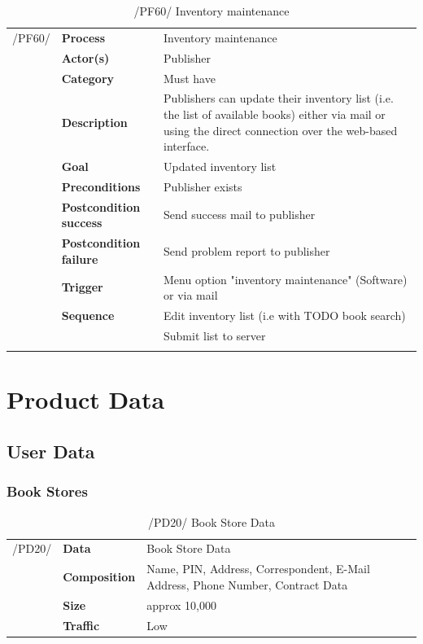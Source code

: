 \documentclass[11pt,a4paper,oneside,svgnames]{report}
\begin{document}
\begin{table}[H]
\centering
\begin{tabular}{p{1.5cm}p{3cm}p{8cm}}
\cellcolor{white}/PF60/	& \textbf{Process} & Inventory maintenance\\
\cellcolor{white}		& \textbf{Actor(s)} & Publisher\\
\cellcolor{white}		& \textbf{Category} & Must have\\
\cellcolor{white}		& \textbf{Description}	 & Publishers can update their inventory list
(i.e. the list of available books) either via mail or using the direct connection over the web-based interface.\\
\cellcolor{white}		& \textbf{Goal} & Updated inventory list\\
\cellcolor{white}		& \textbf{Preconditions} & Publisher exists\\
\cellcolor{white}		& \textbf{Postcondition success} & Send success mail to publisher\\
\cellcolor{white}		& \textbf{Postcondition failure} & Send problem report to publisher\\
\cellcolor{white}		& \textbf{Trigger} & Menu option "inventory maintenance" (Software) or via mail\\
\cellcolor{white}		& \textbf{Sequence} & Edit inventory list (i.e with TODO book search)\\
\cellcolor{white}		& & Submit list to server\\
\cellcolor{white}\hfill \\
\end{tabular}
\caption{/PF60/ Inventory maintenance}
\label{tab:pf60}
\end{table}


\chapter{Product Data}
\section{User Data}
\subsection{Book Stores}


\begin{table}[H]
\centering
\begin{tabular}{llp{8.75cm}}
\cellcolor{white}/PD20/	& \textbf{Data}			& Book Store Data\\
\cellcolor{white}		& \textbf{Composition}	& Name, PIN, Address, Correspondent, E-Mail Address, Phone Number, Contract Data\\
\cellcolor{white}		& \textbf{Size}		& approx 10,000\\
\cellcolor{white}		& \textbf{Traffic}		& Low\\
\end{tabular} 
\caption{/PD20/ Book Store Data}
\label{tab:pd20}
\end{table}
\end{document}
